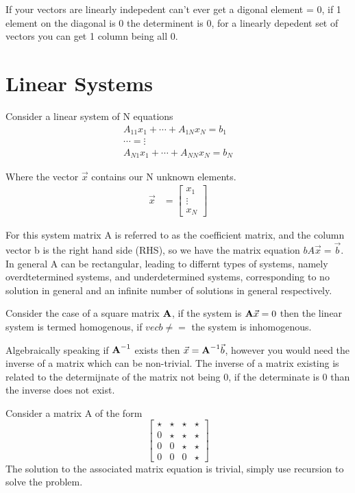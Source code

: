 \documentclass{article}
\newcommand{\be}{\begin{equation}}
\newcommand{\ee}{\end{equation}}
\newcommand{\bA}{\mbox{\bf A}}
\begin{document}
If your vectors are linearly indepedent can't ever get a digonal element = 0, if 1 element on the diagonal is 0 the determinent is 0, for a linearly depedent set of vectors you can get 1 column being all 0.

\section{Linear Systems}
Consider a linear system of N equations
\begin{align}
    A_{11} x_1 + \cdots + A_{1N}x_N = b_1\\
    \cdots = \vdots\\
    A_{N1} x_1 + \cdots + A_{NN}x_N = b_N
\end{align}

Where the vector $\vec{x}$ contains our N unknown elements.
\begin{align}
    \vec{x} &= \begin{bmatrix}
           x_{1} \\
           \vdots \\
           x_{N}
         \end{bmatrix}
\end{align}

For this system matrix A is referred to as the coefficient matrix, and the column vector b is the right hand side (RHS), so we have the matrix equation $bA\vec{x} = \vec{b}$.
In general A can be rectangular, leading to differnt types of systems, namely overdtetermined systems, and underdetermined systems, corresponding to no solution in general and an infinite number of solutions in general respectively.

Consider the case of a square matrix $\bA$, if the system is $\bA\vec{x} = 0$ then the linear system is termed homogenous, if $vec{b} \neq =$ the system is inhomogenous.

Algebraically speaking if $\bA^{-1}$ exists then $\vec{x} = \bA^{-1}\vec{b}$, however you would need the inverse of a matrix which can be non-trivial.
The inverse of a matrix existing is related to the determijnate of the matrix not being 0, if the determinate is 0 than the inverse does not exist.

Consider a matrix A of the form
\be
\begin{bmatrix}
    \star  & \star & \star & \star \\
     0 & \star &\star &  \star \\
     0 & 0 &  \star &  \star \\
    0  & 0 & 0 &  \star
\end{bmatrix}
\ee
The solution to the associated matrix equation is trivial, simply use recursion to solve the problem.
\end{document}
